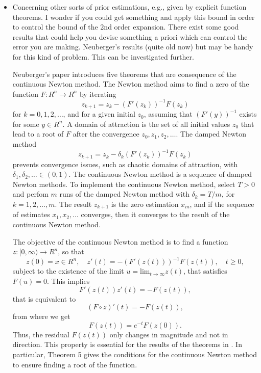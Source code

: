 \documentclass[11pt]{article}
\begin{document}
\begin{itemize}
	\item  Concerning other sorts of prior estimations, e.g., given by explicit function theorems. I wonder if you could get something and apply this bound in order to control the bound of the 2nd order expansion. There exist some good results that could help you devise something a priori which can control the error you are making. Neuberger's results (quite old now) but may be handy for this kind of problem. This can be investigated further.
	
	\color{blue}
	Neuberger's paper \cite{Neuberger07} introduces five theorems that are consequence of the continuous Newton method.
	The Newton method aims to find a zero of the function $F: R^n \rightarrow R^n$ by iterating
	\begin{equation} z_{k+1} = z_k - \left(F' (z_k) \right)^{-1} F(z_k) \end{equation}
	for $k=0,1,2,\ldots$, and for a given initial $z_0$, assuming that $\left(F' (y) \right)^{-1}$ exists for some $y \in R^n$.
	A domain of attraction is the set of all initial values $z_0$ that lead to a root of $F$ after the convergence $z_0, z_1, z_2,\ldots$.
	The damped Newton method  
	\begin{equation} z_{k+1} = z_k - \delta_k \left(F' (z_k) \right)^{-1} F(z_k) \end{equation}
	prevents convergence issues, such as chaotic domains of attraction, with $\delta_1, \delta_2, \ldots \in (0, 1)$. 
	The continuous Newton method is a sequence of damped Newton methods. To implement the continuous Newton method, select $T>0$ and perfom $m$ runs of the damped Newton method with $\delta_k = T/m$, for $k=1,2,\ldots, m$.
	The result $z_{k+1}$ is the zero estimation $x_m$, and if the sequence of estimates $x_1, x_2, \ldots$ converges, then it converges to the result of the continuous Newton method.
	
	The objective of the continuous Newton method is to find a function $z: [0, \infty) \rightarrow R^n$, so that
    \begin{equation} z(0) = x \in R^n, \quad z' (t) = - \left(F' (z(t)) \right)^{-1} F(z(t)), \quad t \geq 0, \label{eqn:contNewton}\end{equation}
    subject to the existence of the limit $u=\mathrm{lim}_{t \rightarrow \infty}{z(t)}$, that satisfies $F(u)=0$.
    This implies 
    \begin{equation}  F' (z(t)) z' (t) = - F(z(t)) , \end{equation}
    that is equivalent to
    \begin{equation}  \left(F \circ z\right)' (t) = - F(z(t)) , \end{equation}
    from where we get
    \begin{equation}  F(z(t)) = e^{-t} F(z(0)) . \end{equation}
    Thus, the residual $F(z(t))$ only changes in magnitude and not in direction.
    This property is essential for the results of the theorems in \cite{Neuberger07}. 
    In particular, Theorem 5 gives the conditions for the continuous Newton method to ensure finding a root of the function.
    

\end{itemize}
\end{document}
